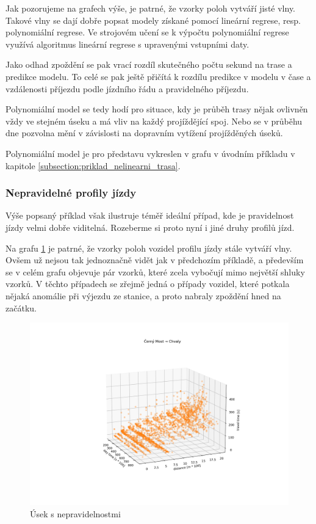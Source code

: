 Jak pozorujeme na grafech výše, je patrné, že vzorky poloh vytváří jisté vlny. Takové vlny se dají dobře popsat modely získané pomocí lineární regrese, resp. polynomiální regrese. Ve strojovém učení se k výpočtu polynomiální regrese využívá algoritmus lineární regrese s upravenými vstupními daty.


\bigbreak


Jako odhad zpoždění se pak vrací rozdíl skutečného počtu sekund na trase a predikce modelu. To celé se pak ještě přičítá k rozdílu predikce v modelu v čase a vzdálenosti příjezdu podle jízdního řádu a pravidelného příjezdu.


\bigbreak


Polynomiální model se tedy hodí pro situace, kdy je průběh trasy nějak ovlivněn vždy ve stejném úseku a má vliv na každý projíždějící spoj. Nebo se v průběhu dne pozvolna mění v závislosti na dopravním vytížení projížděných úseků.


Polynomiální model je pro představu vykreslen v grafu v úvodním příkladu v kapitole \ref{subsection:priklad_nelinearni_trasa}.


\subsubsection{Nepravidelné profily jízdy}


Výše popsaný příklad však ilustruje téměř ideální případ, kde je pravidelnost jízdy velmi dobře viditelná. Rozeberme si proto nyní i jiné druhy profilů jízd.


\bigbreak


Na grafu \ref{fig:cerny_most_chvaly} je patrné, že vzorky poloh vozidel profilu jízdy stále vytváří vlny. Ovšem už nejsou tak jednoznačně vidět jak v předchozím příkladě, a především se v celém grafu objevuje pár vzorků, které zcela vybočují mimo největší shluky vzorků. V těchto případech se zřejmě jedná o případy vozidel, které potkala nějaká anomálie při výjezdu ze stanice, a proto nabraly zpoždění hned na začátku.


\begin{figure}
\centering
  \includegraphics[width=\linewidth]{../img/cerny_most_chvaly.png}
  \caption{Úsek s nepravidelnostmi}
  \label{fig:cerny_most_chvaly}
\end{figure}


